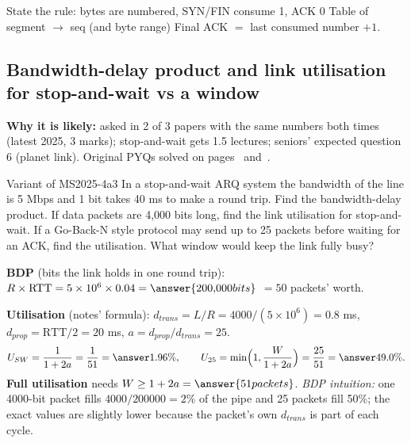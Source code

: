 \begin{answerplan}[2.5 marks]
 State the rule: bytes are numbered, SYN/FIN consume 1, ACK 0 \quad {} Table of segment $\to$ seq (and byte range) \quad {} Final ACK $=$ last consumed number $+1$.
\end{answerplan}

\subsection{Bandwidth-delay product and link utilisation for stop-and-wait vs a window}\label{iq:C23}
    

\textbf{Why it is likely:} asked in 2 of 3 papers with the same numbers both times (latest 2025, 3 marks); stop-and-wait gets 1.5 lectures; seniors' expected question 6 (planet link). Original PYQs solved on pages~\pageref{q:MS2025-4a} and~\pageref{q:MS2022-3Bb}.

\begin{question}{Variant of MS2025-4a}{3}
In a stop-and-wait ARQ system the bandwidth of the line is 5 Mbps and 1 bit takes 40 ms to make a round trip. Find the bandwidth-delay product. If data packets are 4,000 bits long, find the link utilisation for stop-and-wait. If a Go-Back-N style protocol may send up to 25 packets before waiting for an ACK, find the utilisation. What window would keep the link fully busy?
\end{question}
\begin{solution}
\textbf{BDP} (bits the link holds in one round trip): $R\times\text{RTT}=5\times10^{6}\times0.04=\answer{200{,}000 bits}$ $=50$ packets' worth.

\textbf{Utilisation} (notes' formula): $d_{trans}=L/R=4000/(5\times10^{6})=0.8$ ms, $d_{prop}=\text{RTT}/2=20$ ms, $a=d_{prop}/d_{trans}=25$.
\[ U_{SW}=\frac{1}{1+2a}=\frac{1}{51}=\answer{1.96\%}, \qquad U_{25}=\min\!\Big(1,\frac{W}{1+2a}\Big)=\frac{25}{51}=\answer{49.0\%}. \]
\textbf{Full utilisation} needs $W\ge1+2a=\answer{51 packets}$.
\textit{BDP intuition:} one 4000-bit packet fills $4000/200000=2\%$ of the pipe and 25 packets fill 50\%; the exact values are slightly lower because the packet's own $d_{trans}$ is part of each cycle.
\end{solution}

